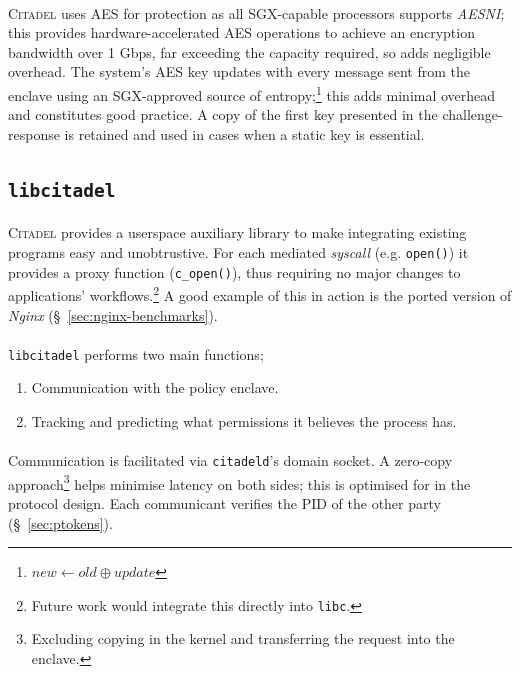 \paragraph{} \textsc{Citadel} uses AES for protection as all SGX-capable processors supports \textit{AESNI};~\cite{aesni} this provides hardware-accelerated AES operations to achieve an encryption bandwidth over 1 Gbps, far exceeding the capacity required, so adds negligible overhead. The system's AES key updates with every message sent from the enclave using an SGX-approved source of entropy;\footnote{$new \leftarrow old \oplus update$} this adds minimal overhead and constitutes good practice. A copy of the first key presented in the challenge-response is retained and used in cases when a static key is essential.

\subsection{\texttt{libcitadel}}
\label{sec:libcitadel}
\paragraph{} \textsc{Citadel} provides a userspace auxiliary library to make integrating existing programs easy and unobtrustive. For each mediated \textit{syscall} (e.g. \texttt{open()}) it provides a proxy function (\texttt{c\_open()}), thus requiring no major changes to applications' workflows.\footnote{Future work would integrate this directly into \texttt{libc}.} A good example of this in action is the ported version of \textit{Nginx} (§~\ref{sec:nginx-benchmarks}).

\paragraph{} \texttt{libcitadel} performs two main functions;
\begin{enumerate}
    \item Communication with the policy enclave.
    \item Tracking and predicting what permissions it believes the process has.
\end{enumerate}

\paragraph{} Communication is facilitated via \texttt{citadeld}'s domain socket. A zero-copy approach\footnote{Excluding copying in the kernel and transferring the request into the enclave.} helps minimise latency on both sides; this is optimised for in the protocol design. Each communicant verifies the PID of the other party (§~\ref{sec:ptokens}).

